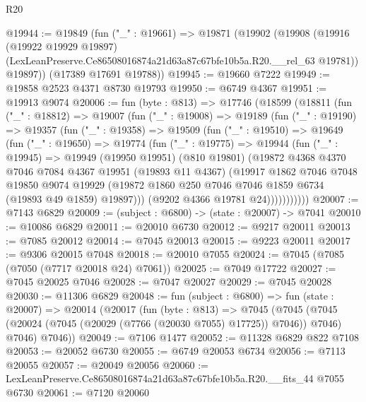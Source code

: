 \begin{lexlean}{R20}
\begin{coremodule}
{@19944 := @19849
    (fun ("_" : @19661) =>
    @19871
      (@19902
        (@19908
          (@19916
            (@19922 @19929 @19897)
            (LexLeanPreserve.Ce86508016874a21d63a87c67bfe10b5a.R20.__rel_63 @19781))
          @19897))
      (@17389 @17691 @19788))
@19945 := @19660 @7222
@19949 := @19858 @2523 @4371 @8730 @19793
@19950 := @6749 @4367
@19951 := @19913 @9074
@20006 := fun (byte : @813) =>
  @17746
    (@18599
      (@18811
        (fun ("_" : @18812) =>
        @19007
          (fun ("_" : @19008) =>
          @19189
            (fun ("_" : @19190) =>
            @19357
              (fun ("_" : @19358) =>
              @19509
                (fun ("_" : @19510) =>
                @19649
                  (fun ("_" : @19650) =>
                  @19774
                    (fun ("_" : @19775) =>
                    @19944
                      (fun ("_" : @19945) =>
                      @19949
                        (@19950 @19951)
                        (@810 @19801)
                        (@19872
                          @4368
                          @4370
                          @7046
                          @7084
                          @4367
                          @19951
                          (@19893 @11 @4367)
                          (@19917
                            @1862
                            @7046
                            @7048
                            @19850
                            @9074
                            @19929
                            (@19872 @1860 @250 @7046 @7046 @1859 @6734 (@19893 @49 @1859) @19897)))
                        (@9202 @4366 @19781 @24)))))))))))
@20007 := @7143 @6829
@20009 := (subject : @6800) -> (state : @20007) -> @7041
@20010 := @10086 @6829
@20011 := @20010 @6730
@20012 := @9217 @20011
@20013 := @7085 @20012
@20014 := @7045 @20013
@20015 := @9223 @20011
@20017 := @9306 @20015 @7048
@20018 := @20010 @7055
@20024 := @7045 (@7085 (@7050 (@7717 @20018 @24) @7061))
@20025 := @7049 @17722
@20027 := @7045 @20025 @7046
@20028 := @7047 @20027
@20029 := @7045 @20028
@20030 := @11306 @6829
@20048 := fun (subject : @6800) =>
  fun (state : @20007) =>
  @20014
    (@20017
      (fun (byte : @813) =>
      @7045
        (@7045 (@7045 (@20024 (@7045 (@20029 (@7766 (@20030 @7055) @17725)) @7046)) @7046) @7046)
        @7046))
@20049 := @7106 @1477
@20052 := @11328 @6829 @822 @7108
@20053 := @20052 @6730
@20055 := @6749 @20053 @6734
@20056 := @7113 @20055
@20057 := @20049 @20056
@20060 := LexLeanPreserve.Ce86508016874a21d63a87c67bfe10b5a.R20.__fits_44 @7055 @6730
@20061 := @7120 @20060
}
\end{coremodule}
\end{lexlean}
